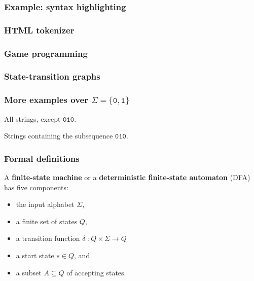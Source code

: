 

\newcommand\sbullet[1][.5]{\mathbin{\vcenter{\hbox{\scalebox{#1}{$\bullet$}}}}}

\renewcommand{\epsilon}{\varepsilon}

\newcommand{\czero}{{\mathtt 0}}
\newcommand{\cone}{{\mathtt 1}}

\begin{frame}
  \frametitle{Example: syntax highlighting}
\end{frame}

\begin{frame}
  \frametitle{HTML tokenizer}
\end{frame}

\begin{frame}
  \frametitle{Game programming}
\end{frame}

\begin{frame}
  \frametitle{State-transition graphs}
\end{frame}

\begin{frame}
  \frametitle{More examples over $\Sigma=\{\czero,\cone\}$}
  All strings, except $\czero\cone\czero$.
  \vspace{1in}

  Strings containing the subsequence $\czero\cone\czero$.
  \vspace{1in}
\end{frame}

\begin{frame}
  \frametitle{Formal definitions}

  A {\color{red}\bf finite-state machine} or a {\color{red}\bf
    deterministic finite-state automaton} (DFA) has five components:

  \pause

  \begin{itemize}
  \item the input alphabet $\Sigma$, \pause
  \item a finite set of states $Q$, \pause
  \item a transition function $\delta$ \pause $:Q\times\Sigma \longrightarrow Q$ \pause
  \item a start state $s\in Q$, and
  \item a subset $A\subseteq Q$ of accepting states.
  \end{itemize}
  
\end{frame}

